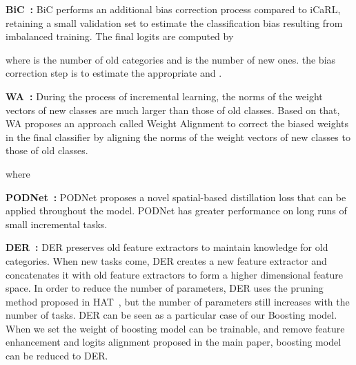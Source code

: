 \documentclass[runningheads]{llncs}
\begin{document}
\noindent \textbf{BiC~\cite{bic}:} BiC performs an additional bias correction process compared to iCaRL, retaining a small validation set to estimate the classification bias resulting from imbalanced training. The final logits are computed by


 where  is the number of old categories and  is the number of new ones. the bias correction step is to estimate the appropriate  and .

\noindent \textbf{WA~\cite{WA}:} During the process of incremental learning, the norms of the weight vectors of new classes are much larger than those of old classes. Based on that, WA proposes an approach called Weight Alignment to correct the biased weights in the final classifier by aligning the norms of the weight vectors of new classes to those of old classes.


where 

\noindent \textbf{PODNet~\cite{douillard2020podnet}:} PODNet proposes a novel spatial-based distillation loss that can be applied throughout the model. PODNet has greater performance on long runs of small incremental tasks.



\noindent \textbf{DER~\cite{der}:} DER preserves old feature extractors to maintain knowledge for old categories. When new tasks come, DER creates a new feature extractor and concatenates it with old feature extractors to form a higher dimensional feature space. In order to reduce the number of parameters, DER uses the pruning method proposed in HAT~\cite{serra2018overcoming}, but the number of parameters still increases with the number of tasks. DER can be seen as a particular case of our Boosting model. When we set the weight  of boosting model can be trainable, and remove feature enhancement and logits alignment proposed in the main paper, boosting model can be reduced to DER.
\end{document}
